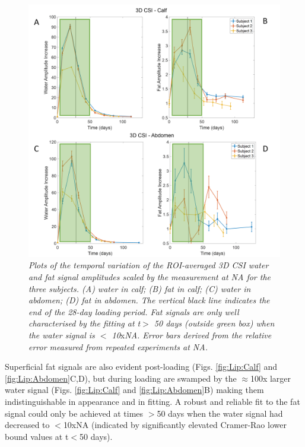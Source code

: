 \begin{figure}
    \centering
    \includegraphics[width=1\textwidth]{Figures/Lipid/3DCSI_Amplitude.png}
    \caption{\textit{Plots of the temporal variation of the \ac{ROI}-averaged 3D \ac{CSI} water and fat signal amplitudes scaled by the measurement at \ac{NA} for the three subjects. (A) water in calf; (B) fat in calf; (C) water in abdomen; (D) fat in abdomen. The vertical black line indicates the end of the 28-day loading period. Fat signals are only well characterised by the fitting at t$>$ 50 days (outside green box) when the water signal is $<$ 10}x\textit{\ac{NA}.  Error bars derived from the relative error measured from repeated experiments at NA.}}
    \label{fig:Lip:3DCSI}
\end{figure}

Superficial fat signals are also evident post-loading (Figs. \ref{fig:Lip:Calf} and \ref{fig:Lip:Abdomen}C,D), but during loading are swamped by the $\approx$100x larger water signal (Figs. \ref{fig:Lip:Calf} and \ref{fig:Lip:Abdomen}B) making them indistinguishable in appearance and in fitting. A robust and reliable fit to the fat signal could only be achieved at times $>$50 days when the water signal had decreased to $<$10x\ac{NA} (indicated by significantly elevated Cramer-Rao lower bound values at t$<$50 days).

